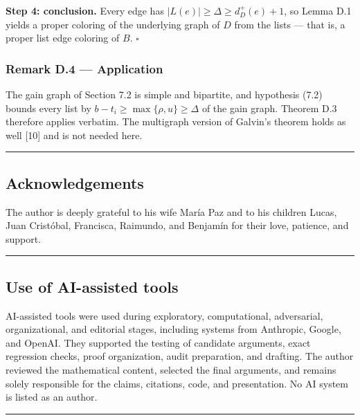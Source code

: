 \documentclass[
  11pt,
]{article}
\begin{document}
\textbf{Step 4: conclusion.} Every edge has
\(|L(e)|\ge\Delta\ge d^+_D(e)+1\), so Lemma D.1 yields a proper coloring
of the underlying graph of \(D\) from the lists --- that is, a proper
list edge coloring of \(B\). \(\square\)

\subsubsection{Remark D.4 --- Application}\label{remark-d.4-application}

The gain graph of Section 7.2 is simple and bipartite, and hypothesis
(7.2) bounds every list by \(b-t_i\ge\max\{\rho,u\}\ge\Delta\) of the
gain graph. Theorem D.3 therefore applies verbatim. The multigraph
version of Galvin's theorem holds as well {[}10{]} and is not needed
here.

\begin{center}\rule{0.5\linewidth}{0.5pt}\end{center}

\subsection{Acknowledgements}\label{acknowledgements}

The author is deeply grateful to his wife María Paz and to his children
Lucas, Juan Cristóbal, Francisca, Raimundo, and Benjamín for their love,
patience, and support.

\begin{center}\rule{0.5\linewidth}{0.5pt}\end{center}

\subsection{Use of AI-assisted tools}\label{use-of-ai-assisted-tools}

AI-assisted tools were used during exploratory, computational,
adversarial, organizational, and editorial stages, including systems
from Anthropic, Google, and OpenAI. They supported the testing of
candidate arguments, exact regression checks, proof organization, audit
preparation, and drafting. The author reviewed the mathematical content,
selected the final arguments, and remains solely responsible for the
claims, citations, code, and presentation. No AI system is listed as an
author.

\begin{center}\rule{0.5\linewidth}{0.5pt}\end{center}
\end{document}
